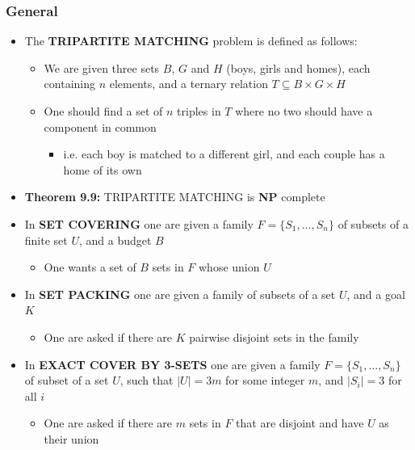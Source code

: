 \documentclass[11pt]{article}
\begin{document}
\subsubsection{General}
\label{sec:org8c68972}
\begin{itemize}
\item The \textbf{TRIPARTITE MATCHING} problem is defined as follows:
\begin{itemize}
\item We are given three sets \(B\), \(G\) and \(H\) (boys, girls and homes), each containing \(n\) elements, and a ternary relation \(T \subseteq B \times G \times H\)
\item One should find a set of \(n\) triples in \(T\) where no two should have a component in common
\begin{itemize}
\item i.e. each boy is matched to a different girl, and each couple has a home of its own
\end{itemize}
\end{itemize}

\item \textbf{Theorem 9.9:} TRIPARTITE MATCHING is \textbf{NP} complete

\item In \textbf{SET COVERING} one are given a family \(F=\{S_1, \dots, S_n\}\) of subsets of a finite set \(U\), and a budget \(B\)
\begin{itemize}
\item One wants a set of \(B\) sets in \(F\) whose union \(U\)
\end{itemize}

\item In \textbf{SET PACKING} one are given a family of subsets of a set \(U\), and a goal \(K\)
\begin{itemize}
\item One are asked if there are \(K\) pairwise disjoint sets in the family
\end{itemize}

\item In \textbf{EXACT COVER BY 3-SETS} one are given a family \(F=\{S_1, \dots, S_n\}\) of subset of a set \(U\), such that \(|U| = 3m\) for some integer \(m\), and \(|S_i| = 3\) for all \(i\)
\begin{itemize}
\item One are asked if there are \(m\) sets in \(F\) that are disjoint and have \(U\) as their union
\end{itemize}


\end{itemize}
\end{document}
